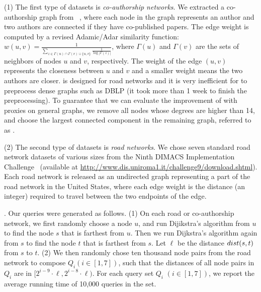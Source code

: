 \sstab (1) The first type of datasets is {\em co-authorship networks}. We extracted a co-authorship graph from \dblp~\cite{snapnets}, where each node in the graph represents an author and two authors are connected if they have co-published papers. The edge weight is computed by a revised Adamic/Adar similarity function: $w(u,v) = \frac{1}{\sum_{z\in {\Gamma(u)\cap \Gamma(v) \cup \{u,v\}}}\frac{1}{\log{|\Gamma(z)|}}}$, where $\Gamma(u)$ and $\Gamma(v)$ are the sets of neighbors of nodes $u$ and $v$, respectively. The weight of the edge $(u,v)$ represents the closeness between $u$ and $v$ and a smaller weight means the two authors are closer. \tnr is designed for road networks and it is very inefficient for \tnr to preprocess dense graphs such as DBLP (it took more than 1 week to finish the preprocessing). To guarantee that we can evaluate the improvement of \tnr with proxies on general graphs, we remove all nodes whose degrees are higher than 14, and choose the largest connected component in the remaining graph, referred to as \dblpone.


\sstab (2) The second type of datasets is {\em road networks}. We chose seven standard road network datasets of various sizes from the Ninth DIMACS
Implementation Challenge~\cite{dimacs-datasets} (available at {\url{http://www.dis.uniroma1.it/challenge9/download.shtml}}). Each road network is released as an undirected graph representing a part of the road network in the United States, where each edge weight is the distance (an integer) required to travel between the two endpoints of the edge.


. Our queries were generated as follows.
(1) On each road  or co-authorship network, we first randomly choose a node $u$, and run Dijikstra's algorithm from $u$ to find the node $s$ that is farthest from $u$. Then we run Dijkstra's algorithm again from $s$ to find the node $t$ that is farthest from $s$. Let $\ell$ be the distance $\dist(s,t)$ from $s$ to $t$.
(2) We then randomly chose ten thousand node pairs from
the road network to compose $Q_i (i \in [1,7])$, such that the
distances of all node pairs in $Q_i$ are in $[2^{i-9}\cdot\ell, 2^{i-8}\cdot\ell)$.
For each query set $Q_i$ $(i\in [1,7])$, we report the average running time of 10,000 queries in the set.



